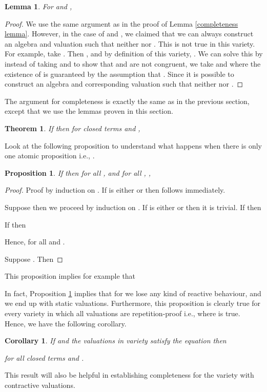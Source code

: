 \documentclass[a4paper,twoside,openright]{report}
\newtheorem{prop}[theorem]{Proposition}
\newtheorem{lem}[theorem]{Lemma}
\newtheorem{thm}[theorem]{Theorem}
\newtheorem{cor}[theorem]{Corollary}
\begin{document}
\begin{lem}\label{rp completeness lemma}
For  and ,

\end{lem}
\begin{proof}
We use the same argument as in the proof of Lemma \ref{completeness lemma}. However, in the case of  and , we claimed that we can always construct an algebra  and valuation  such that neither  nor . This is not true in this variety. For example, take . Then , and by definition of this variety, . We can solve this by instead of taking  and  to show that  and  are not congruent, we take  and  where the existence of  is guaranteed by the assumption that . Since it is possible to construct an algebra and corresponding valuation  such that neither  nor .
\end{proof}

The argument for completeness is exactly the same as in the previous section, except that we use the lemmas proven in this section.
\begin{thm}
If  then for closed terms  and ,

\end{thm}

Look at the following proposition to understand what happens when there is only one atomic proposition i.e., .
\begin{prop}\label{prop one}
If  then for all ,  and for all , ,

\end{prop}
\begin{proof}
Proof by induction on . If  is either  or  then  follows immediately.

Suppose  then we proceed by induction on . If  is either  or  then it is trivial. If  then

If  then

Hence,  for all  and .

Suppose . Then

\end{proof}
This proposition implies for example that

In fact, Proposition \ref{prop one} implies that for  we lose any kind of reactive behaviour, and we end up with static valuations. Furthermore, this proposition is clearly true for every variety in which all valuations are repetition-proof i.e., where  is true. Hence, we have the following corollary.
\begin{cor}\label{cor one}
If  and the valuations in variety  satisfy the equation  then

for all closed terms  and .
\end{cor}
This result will also be helpful in establishing completeness for the variety with contractive valuations.
\end{document}
